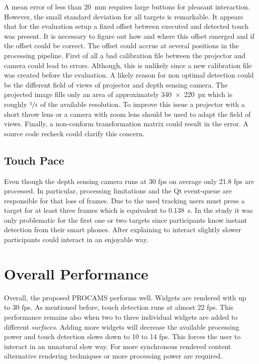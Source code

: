 A mean error of less than \SI{20}{\mm} requires large buttons for pleasant interaction. However, the small standard deviation for all targets is remarkable. It appears that for the evaluation setup a fixed offset between executed and detected touch was present. It is necessary to figure out how and where this offset emerged and if the offset could be correct. 
The offset could accrue at several positions in the processing pipeline. First of all a bad calibration file between the projector and camera could lead to errors. Although, this is unlikely since a new calibration file was created before the evaluation. A likely reason for non optimal detection could be the different field of views of projector and depth sensing camera. The projected image fills only an area of approximately \SI{340x220}{px} which is roughly $\sfrac{1}{4}$ of the available resolution. To improve this issue a projector with a short throw lens or a camera with zoom lens should be used to adapt the field of views. Finally, a non-conform transformation matrix could result in the error. A source code recheck could clarify this concern.

\subsection{Touch Pace}
Even though the depth sensing camera runs at 30 \ac{fps} on average only 21.8 fps are processed. In particular, processing limitations and the Qt event-queue are responsible for that loss of frames. Due to the used tracking users must press a target for at least three frames which is equivalent to \SI{0.138}{\second}. In the study it was only problematic for the first one or two targets since participants know instant detection from their smart phones. After explaining to interact slightly slower participants could interact in an enjoyable way. 


\section{Overall Performance}
Overall, the proposed PROCAMS performs well. Widgets are rendered with up to 30 fps.
As mentioned before, touch detection runs at almost 22 fps. This performance remains also when two to three individual widgets are added to different \textit{surfaces}. Adding more widgets will decrease the available processing power and touch detection slows down to 10 to 14 fps. This forces the user to interact in an unnatural slow way. For more synchronous rendered content alternative rendering techniques or more processing power are required. 

